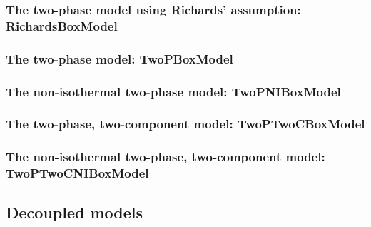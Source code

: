 \subsubsection{The two-phase model using Richards' assumption: RichardsBoxModel} 


\subsubsection{The two-phase model: TwoPBoxModel} 


\subsubsection{The non-isothermal two-phase model: TwoPNIBoxModel} 


\subsubsection{The two-phase, two-component model: TwoPTwoCBoxModel} 


\subsubsection{The non-isothermal two-phase, two-component model: TwoPTwoCNIBoxModel} 



\subsection{Decoupled models} 







